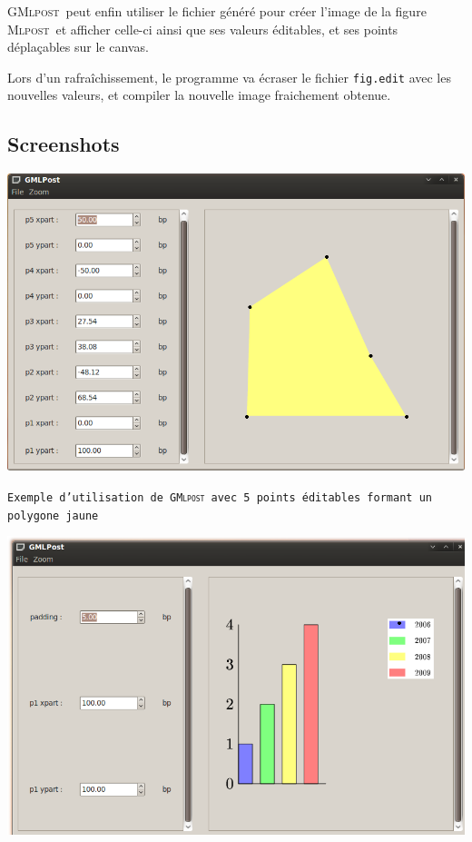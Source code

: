 \documentclass[a4paper,12pt]{article}
\newcommand{\mlpost}{\textsc{Mlpost}}
\newcommand{\gmlpost}{\textsc{GMlpost}}
\begin{document}
\gmlpost\ peut enfin utiliser le fichier généré pour créer l'image de la figure \mlpost\ et afficher celle-ci ainsi que ses valeurs éditables, et ses points déplaçables sur le canvas.

Lors d'un rafraîchissement, le programme va écraser le fichier \texttt{fig.edit} avec les nouvelles valeurs, et compiler la nouvelle image fraichement obtenue.

\newpage
\subsection{Screenshots}
\bigskip

\includegraphics[scale=0.45]{screen1.png}

\begin{center}
\texttt{Exemple d'utilisation de \gmlpost\ avec 5 points éditables formant un polygone jaune} 
\end{center}

\includegraphics[scale=0.45]{screen2.png}
\end{document}
